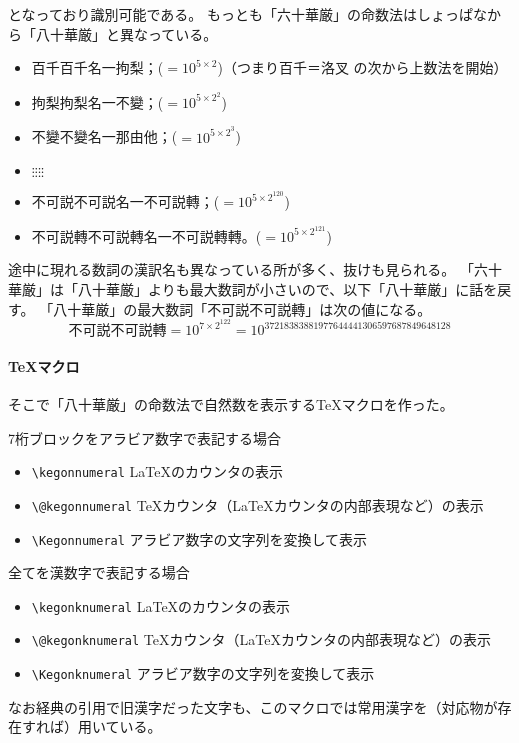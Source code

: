 \documentclass[dvipdfmx]{jsarticle}
\begin{document}
となっており識別可能である。
もっとも「六十華厳」の命数法はしょっぱなから「八十華厳」と異なっている。
\begin{itemize}
\item 百千百千名一拘梨；($=10^{5\times2}$)（つまり百千＝洛叉 の次から上数法を開始）
\item 拘梨拘梨名一不變；($=10^{5\times2^2}$)
\item 不變不變名一那由他；($=10^{5\times2^3}$)
\item $\vdots$\hfil$\vdots$\hfil$\vdots$\hfil$\vdots$\hfil\hfil\hfil
\item 不可説不可説名一不可説轉；($=10^{5\times2^{120}}$)
\item 不可説轉不可説轉名一不可説轉轉。($=10^{5\times2^{121}}$)
\end{itemize}
途中に現れる数詞の漢訳名も異なっている所が多く、抜けも見られる。
「六十華厳」は「八十華厳」よりも最大数詞が小さいので、以下「八十華厳」に話を戻す。
「八十華厳」の最大数詞「不可説不可説轉」は次の値になる。
\[
\text{不可説不可説轉}=10^{7\times2^{122}}=10^{37218383881977644441306597687849648128}
\]

\paragraph{\TeX マクロ}
そこで「八十華厳」の命数法で自然数を表示する\TeX マクロを作った。
\begin{itembox}[l]{7桁ブロックをアラビア数字で表記する場合}
\begin{itemize}
\item \verb+\kegonnumeral+ \LaTeX のカウンタの表示
\item \verb+\@kegonnumeral+ \TeX カウンタ（\LaTeX カウンタの内部表現など）の表示
\item \verb+\Kegonnumeral+ アラビア数字の文字列を変換して表示
\end{itemize}  
\end{itembox}
\begin{itembox}[l]{全てを漢数字で表記する場合}
\begin{itemize}
\item \verb+\kegonknumeral+ \LaTeX のカウンタの表示
\item \verb+\@kegonknumeral+ \TeX カウンタ（\LaTeX カウンタの内部表現など）の表示
\item \verb+\Kegonknumeral+ アラビア数字の文字列を変換して表示
\end{itemize}  
\end{itembox}
なお経典の引用で旧漢字だった文字も、このマクロでは常用漢字を（対応物が存在すれば）用いている。
\end{document}
